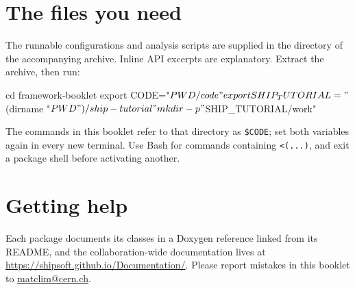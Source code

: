 \section*{The files you need}

The runnable configurations and analysis scripts are supplied in the
 directory of the accompanying archive.
Inline API excerpts are explanatory. Extract the archive, then run:

\begin{shell}
cd framework-booklet
export CODE="$PWD/code"
export SHIP_TUTORIAL="$(dirname "$PWD")/ship-tutorial"
mkdir -p "$SHIP_TUTORIAL/work"
\end{shell}
The commands in this booklet refer to that directory as \texttt{\$CODE}; set
both variables again in every new terminal. Use Bash for commands containing
\texttt{<(...)}, and exit a package shell before activating another.

\section*{Getting help}

Each package documents its classes in a Doxygen reference linked from its
README, and the collaboration-wide documentation lives at
\url{https://shipsoft.github.io/Documentation/}. Please report mistakes in this
booklet to \href{mailto:matclim@cern.ch}{matclim@cern.ch}.

